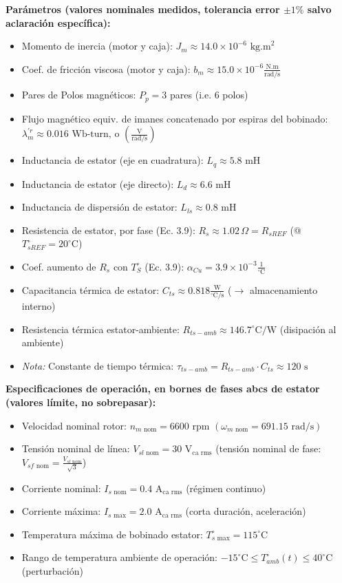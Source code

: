 \documentclass[11pt,a4paper]{article}
\begin{document}
\textbf{Parámetros (valores nominales medidos, tolerancia error \(\pm 1\%\) salvo aclaración específica):}
\begin{itemize}
    \item Momento de inercia (motor y caja): $J_{m} \approx 14.0 \times 10^{-6} \text{ kg.m}^2$
    \item Coef. de fricción viscosa (motor y caja): $b_{m} \approx 15.0 \times 10^{-6} \frac{\text{N.m}}{\text{rad/s}}$
    \item Pares de Polos magnéticos: $P_p = 3$ pares (i.e. 6 polos)
    \item Flujo magnético equiv. de imanes concatenado por espiras del bobinado: $\lambda_{m}^{\prime r} \approx 0.016 \text{ Wb-turn, o } \left(\frac{\text{V}}{\text{rad/s}}\right)$
    \item Inductancia de estator (eje en cuadratura): $L_q \approx 5.8 \text{ mH}$
    \item Inductancia de estator (eje directo): $L_d \approx 6.6 \text{ mH}$
    \item Inductancia de dispersión de estator: $L_{ls} \approx 0.8 \text{ mH}$
    \item Resistencia de estator, por fase (Ec. 3.9): $R_s \approx 1.02 \, \Omega = R_{sREF}$ (@ $T_{sREF}^\circ = 20^\circ\text{C}$)
    \item Coef. aumento de $R_s$ con $T_S^\circ$ (Ec. 3.9): $\alpha_{Cu} = 3.9 \times 10^{-3} \frac{1}{^\circ\text{C}}$
    \item Capacitancia térmica de estator: $C_{ts} \approx 0.818 \frac{\text{W}}{^\circ\text{C/s}}$ ($\rightarrow$ almacenamiento interno)
    \item Resistencia térmica estator-ambiente: $R_{ts-amb} \approx 146.7 ^\circ\text{C/W}$ (disipación al ambiente)
    \item \textit{Nota:} Constante de tiempo térmica: $\tau_{ts-amb} = R_{ts-amb} \cdot C_{ts} \approx 120 \text{ s}$
\end{itemize}

\textbf{Especificaciones de operación, en bornes de fases abcs de estator (valores límite, no sobrepasar):}
\begin{itemize}
    \item Velocidad nominal rotor: $n_{m \text{ nom}} = 6600 \text{ rpm } (\omega_{m \text{ nom}} = 691.15 \text{ rad/s})$
    \item Tensión nominal de línea: $V_{sl \text{ nom}} = 30 \text{ V}_{\text{ca rms}}$ (tensión nominal de fase: $V_{sf \text{ nom}} = \frac{V_{sl \text{ nom}}}{\sqrt{3}}$)
    \item Corriente nominal: $I_{s \text{ nom}} = 0.4 \text{ A}_{\text{ca rms}}$ (régimen continuo)
    \item Corriente máxima: $I_{s \text{ max}} = 2.0 \text{ A}_{\text{ca rms}}$ (corta duración, aceleración)
    \item Temperatura máxima de bobinado estator: $T_{s \text{ max}}^\circ = 115^\circ\text{C}$
    \item Rango de temperatura ambiente de operación: $-15^\circ\text{C} \le T_{amb}^\circ(t) \le 40^\circ\text{C}$ (perturbación)
\end{itemize}
\end{document}
